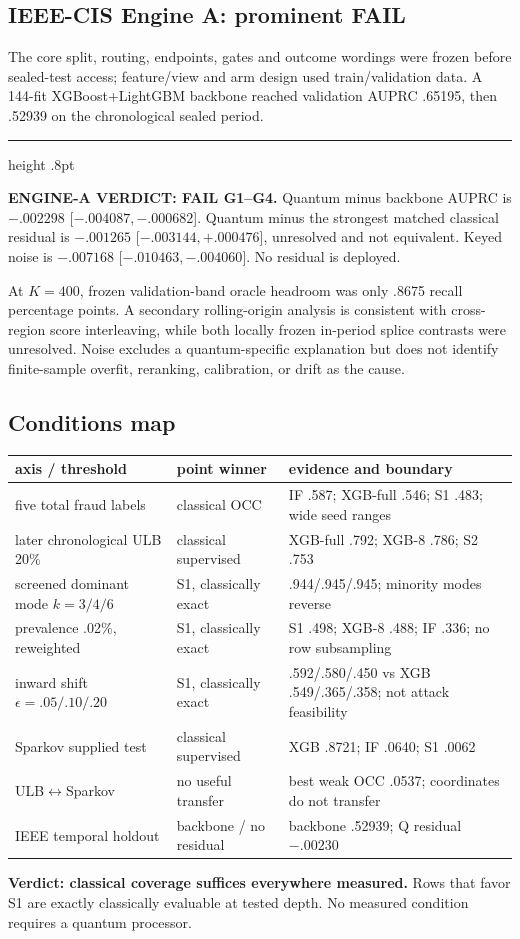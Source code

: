 \documentclass[10pt,a4paper]{article}
\newenvironment{resultbox}
 {\par\smallskip\noindent\begin{minipage}{\linewidth}%
  {\color{blue!45!black}\hrule height .8pt}\vspace{3pt}\small}
 {\vspace{3pt}{\color{blue!45!black}\hrule height .8pt}\end{minipage}\par\smallskip}
\begin{document}
\subsection{IEEE-CIS Engine A: prominent FAIL}

The core split, routing, endpoints, gates and outcome wordings were frozen
before sealed-test access; feature/view and arm design used train/validation
data. A 144-fit XGBoost+LightGBM backbone reached validation AUPRC .65195,
then .52939 on the chronological sealed period.
\begin{resultbox}
\textbf{ENGINE-A VERDICT: FAIL G1--G4.} Quantum minus backbone AUPRC is
$-.002298$ [$-.004087,-.000682$]. Quantum minus the strongest matched
classical residual is $-.001265$ [$-.003144,+.000476$], unresolved and not
equivalent. Keyed noise is $-.007168$ [$-.010463,-.004060$]. No residual is
deployed.
\end{resultbox}
At $K=400$, frozen validation-band oracle headroom was only .8675 recall
percentage points. A secondary rolling-origin analysis is consistent with
cross-region score interleaving, while both locally frozen in-period splice
contrasts were unresolved. Noise excludes a quantum-specific explanation but
does not identify finite-sample overfit, reranking, calibration, or drift as
the cause.

\subsection{Conditions map}
\begin{center}\scriptsize
\begin{tabularx}{\linewidth}{@{}p{.23\linewidth}p{.18\linewidth}X@{}}
\toprule
axis / threshold & point winner & evidence and boundary\\
\midrule
five total fraud labels & classical OCC & IF .587; XGB-full .546; S1 .483; wide seed ranges\\
later chronological ULB 20\% & classical supervised & XGB-full .792; XGB-8 .786; S2 .753\\
screened dominant mode $k=3/4/6$ & S1, classically exact & .944/.945/.945; minority modes reverse\\
prevalence .02\%, reweighted & S1, classically exact & S1 .498; XGB-8 .488; IF .336; no row subsampling\\
inward shift $\epsilon=.05/.10/.20$ & S1, classically exact & .592/.580/.450 vs XGB .549/.365/.358; not attack feasibility\\
Sparkov supplied test & classical supervised & XGB .8721; IF .0640; S1 .0062\\
ULB$\leftrightarrow$Sparkov & no useful transfer & best weak OCC .0537; coordinates do not transfer\\
IEEE temporal holdout & backbone / no residual & backbone .52939; Q residual $-.00230$\\
\bottomrule
\end{tabularx}
\end{center}
\textbf{Verdict: classical coverage suffices everywhere measured.} Rows that
favor S1 are exactly classically evaluable at tested depth. No measured
condition requires a quantum processor.
\end{document}

